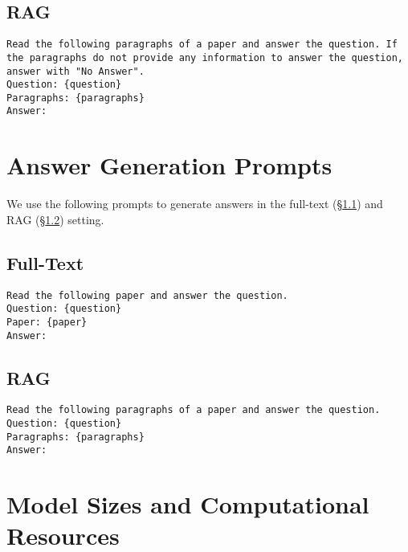\subsection{RAG}\label{sec:appendix-answerability-prompt-rag}
\texttt{Read the following paragraphs of a paper and answer the question. If the paragraphs do not provide any information to answer the question, answer with "No Answer".\\
Question: \{question\}\\
Paragraphs: \{paragraphs\}\\
Answer:
}

\section{Answer Generation Prompts}\label{sec:appendix-answer-generation-prompt}
We use the following prompts to generate answers in the full-text (\S\ref{sec:appendix-answer-generation-prompt-full-text}) and RAG (\S\ref{sec:appendix-answer-generation-prompt-rag}) setting.
\subsection{Full-Text}\label{sec:appendix-answer-generation-prompt-full-text}
\texttt{Read the following paper and answer the question.\\
Question: \{question\}\\
Paper: \{paper\}\\
Answer:
}
\subsection{RAG}\label{sec:appendix-answer-generation-prompt-rag}
\texttt{Read the following paragraphs of a paper and answer the question.\\
Question: \{question\}\\
Paragraphs: \{paragraphs\}\\
Answer:
}

\section{Model Sizes and Computational Resources}

